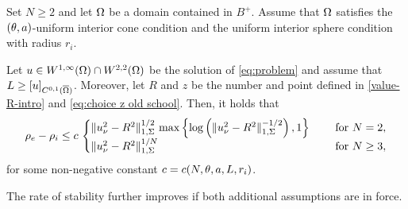 \documentclass[a4paper,10pt]{amsart}
\numberwithin{equation}{section}
\begin{document}
\begin{thm}[$\Om$ is smooth]
\label{thm:Improvement2}
Set $N\ge 2$ and let $\Om$ be a domain contained in $B^+$. Assume that $\Om$ satisfies the $(\theta,a)$-uniform interior cone condition and the uniform interior sphere condition with radius $r_i$.
\par
Let $u\in W^{1,\infty}(\Omega)\cap W^{2,2} (\Omega)$ be the solution of \eqref{eq:problem} and assume that $L\ge [u]_{C^{0,1}(\overline{\Omega})}$.	Moreover, let $R$ and $z$ be the number and point defined in \eqref{value-R-intro} and \eqref{eq:choice z old school}. Then, it holds that
	\begin{equation*}
		\rho_e-\rho_i\le c \,
		\begin{cases}
			\Vert u_\nu^2 - R^2 \Vert_{1,\Sigma}^{1/2} \, \max \left\{ \log \left(\Vert u_\nu^2 - R^2 \Vert_{1,\Sigma}^{-1/2 }  \right) , 1 \right\} \quad & \text{ for } N =2 ,
			\\
			\Vert u_\nu^2 - R^2 \Vert_{1,\Sigma}^{1/N}  \quad & \text{ for } N \ge 3 ,
		\end{cases}
	\end{equation*}
for some non-negative constant $c=c(N, \theta, a, L , r_i)$.
\end{thm}

The rate of stability further improves if both additional assumptions are in force.
\end{document}
